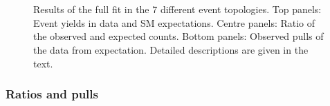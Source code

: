 \begin{figure}[!h]
{  }\\
  ~ 
  \\
  \caption{\label{fig:full-fit} Results of the full fit in the 7 different event topologies.
  Top panels:  Event yields in data and SM expectations.
  Centre panels:  Ratio of the observed and expected counts.
  Bottom panels:  Observed pulls of the data from expectation.
  Detailed descriptions are given in the text.
	}
\end{figure}

\clearpage
\subsubsection{Ratios and pulls}

